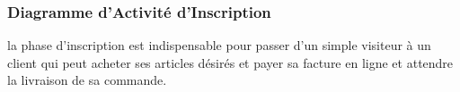 \subsubsection{Diagramme d'Activité d'Inscription}

la phase d'inscription est indispensable pour passer d'un simple visiteur à un client qui peut acheter ses articles désirés et payer sa facture en ligne et attendre la livraison de sa commande.